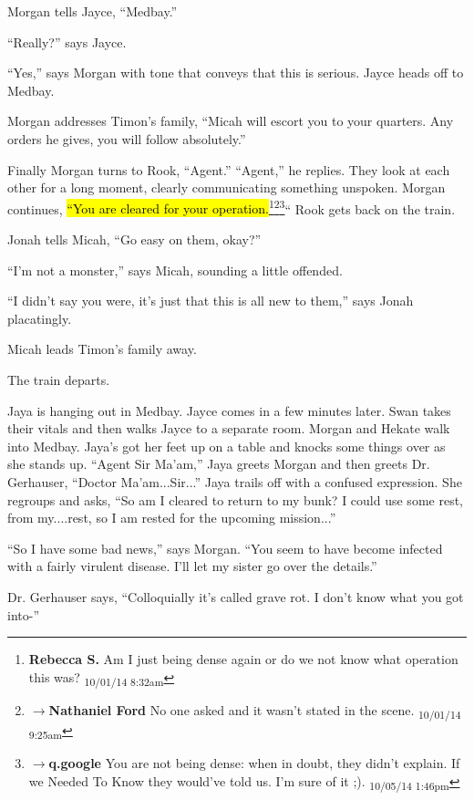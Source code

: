 Morgan tells Jayce, ``Medbay.''

``Really?'' says Jayce.

``Yes,'' says Morgan with tone that conveys that this is serious.  Jayce heads off to Medbay.

Morgan addresses Timon's family, ``Micah will escort you to your quarters.  Any orders he gives, you will follow absolutely.''

Finally Morgan turns to Rook, ``Agent.''  ``Agent,'' he replies.  They look at each other for a long moment, clearly communicating something unspoken.  Morgan continues, \hl{``You are cleared for your operation.}\footnote{\textbf{Rebecca S. }Am I just being dense again or do we not know what operation this was? \textsubscript{10/01/14 8:32am}}\footnote{$\rightarrow$\textbf{Nathaniel Ford }No one asked and it wasn't stated in the scene. \textsubscript{10/01/14 9:25am}}\footnote{$\rightarrow$\textbf{q.google }You are not being dense: when in doubt, they didn't explain.  If we Needed To Know they would've told us.  I'm sure of it ;). \textsubscript{10/05/14 1:46pm}}``  Rook gets back on the train.

Jonah tells Micah, ``Go easy on them, okay?''

``I'm not a monster,'' says Micah, sounding a little offended.

``I didn't say you were, it's just that this is all new to them,'' says Jonah placatingly.

Micah leads Timon's family away.

The train departs.





Jaya is hanging out in Medbay.  Jayce comes in a few minutes later.  Swan takes their vitals and then walks Jayce to a separate room.  Morgan and Hekate walk into Medbay.  Jaya's got her feet up on a table and knocks some things over as she stands up. ``Agent Sir Ma'am,'' Jaya greets Morgan and then greets Dr. Gerhauser, ``Doctor Ma'am...Sir...'' Jaya trails off with a confused expression.  She regroups and asks, ``So am I cleared to return to my bunk?  I could use some rest, from my....rest, so I am rested for the upcoming mission...''

``So I have some bad news,'' says Morgan.  ``You seem to have become infected with a fairly virulent disease.  I'll let my sister go over the details.''

Dr. Gerhauser says, ``Colloquially it's called grave rot.  I don't know what you got into-''

